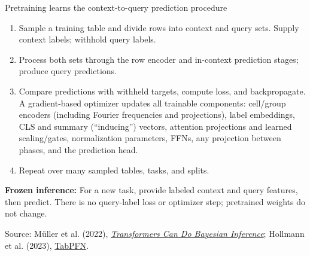\documentclass[11pt,aspectratio=169,hyperref={colorlinks}]{beamer}
\newcommand{\slidesource}[1]{\par\vfill\noindent\parbox{\linewidth}{\tiny\color{sourcegray}\raggedright\sloppy Source: #1.}}
\begin{document}
\begin{frame}{Pretraining learns the context-to-query prediction procedure}
\small
{\footnotesize
\begin{enumerate}\itemsep.55em
\item Sample a training table and divide rows into context and query sets. Supply context labels; withhold query labels.
\item Process both sets through the row encoder and in-context prediction stages; produce query predictions.
\item Compare predictions with withheld targets, compute loss, and backpropagate. A gradient-based optimizer updates all trainable components: cell/group encoders (including Fourier frequencies and projections), label embeddings, CLS and summary (``inducing'') vectors, attention projections and learned scaling/gates, normalization parameters, FFNs, any projection between phases, and the prediction head.
\item Repeat over many sampled tables, tasks, and splits.
\end{enumerate}
}
\begin{block}{\textbf{Frozen inference:}}
For a new task, provide labeled context and query features, then predict. There is no query-label loss or optimizer step; pretrained weights do not change.
\end{block}
\slidesource{Müller et al. (2022), \href{https://openreview.net/forum?id=KSugKcbNf9}{\emph{Transformers Can Do Bayesian Inference}}; Hollmann et al. (2023), \href{https://arxiv.org/abs/2207.01848}{TabPFN}}
\end{frame}
\end{document}

